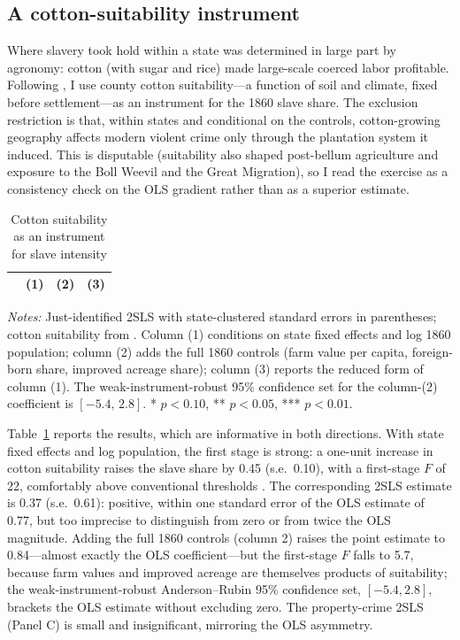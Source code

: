 \documentclass[12pt]{article}
\begin{document}
\subsection{A cotton-suitability instrument}\label{sec:iv}

Where slavery took hold within a state was determined in large part by agronomy: cotton (with sugar and rice) made large-scale coerced labor profitable. Following \citet{abs2016}, I use county cotton suitability---a function of soil and climate, fixed before settlement---as an instrument for the 1860 slave share. The exclusion restriction is that, within states and conditional on the controls, cotton-growing geography affects modern violent crime only through the plantation system it induced. This is disputable (suitability also shaped post-bellum agriculture and exposure to the Boll Weevil and the Great Migration), so I read the exercise as a consistency check on the OLS gradient rather than as a superior estimate.

\begin{table}[H]
\centering
\caption{Cotton suitability as an instrument for slave intensity}
\label{tab:iv}
\begin{tabular}{lccc}
\toprule
 & (1) & (2) & (3) \\
\midrule

\bottomrule
\end{tabular}
\par\smallskip
\footnotesize\textit{Notes:} Just-identified 2SLS with state-clustered standard errors in parentheses; cotton suitability from \citet{absdata}. Column (1) conditions on state fixed effects and log 1860 population; column (2) adds the full 1860 controls (farm value per capita, foreign-born share, improved acreage share); column (3) reports the reduced form of column (1). The weak-instrument-robust \citet{andersonrubin1949} 95\% confidence set for the column-(2) coefficient is $[-5.4,\, 2.8]$. * $p<0.10$, ** $p<0.05$, *** $p<0.01$.
\end{table}

Table~\ref{tab:iv} reports the results, which are informative in both directions. With state fixed effects and log population, the first stage is strong: a one-unit increase in cotton suitability raises the slave share by 0.45 (s.e.\ 0.10), with a first-stage $F$ of 22, comfortably above conventional thresholds \citep{staigerstock1997}. The corresponding 2SLS estimate is 0.37 (s.e.\ 0.61): positive, within one standard error of the OLS estimate of 0.77, but too imprecise to distinguish from zero or from twice the OLS magnitude. Adding the full 1860 controls (column 2) raises the point estimate to 0.84---almost exactly the OLS coefficient---but the first-stage $F$ falls to 5.7, because farm values and improved acreage are themselves products of suitability; the weak-instrument-robust Anderson--Rubin 95\% confidence set, $[-5.4, 2.8]$, brackets the OLS estimate without excluding zero. The property-crime 2SLS (Panel C) is small and insignificant, mirroring the OLS asymmetry.
\end{document}
